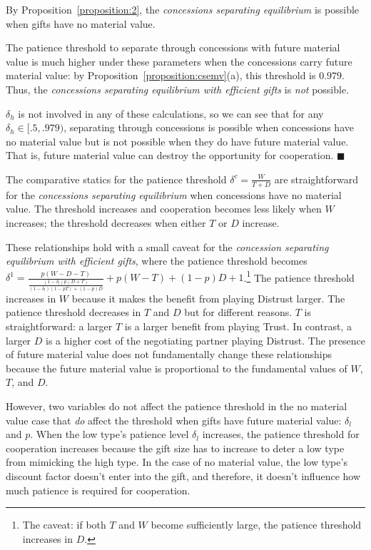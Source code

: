 \documentclass[bibtex,autowc]{apsr_submission}
\newcommand{\de}{\delta}
\begin{document}
By Proposition~\ref{proposition:2}, the \emph{concessions separating equilibrium} is possible when gifts have no material value.

The patience threshold to separate through concessions with future material value is much higher under these parameters when the concessions carry future material value: by Proposition~\ref{proposition:csemv}(a), this threshold is $0.979$. Thus, the \emph{concessions separating equilibrium with efficient gifts} is \emph{not} possible. 

$\de_h$ is not involved in any of these calculations, so we can see that for any $\de_h \in [.5,.979)$, separating through concessions is possible when concessions have no material value but is not possible when they do have future material value. That is, future material value can destroy the opportunity for cooperation. \hfill $\blacksquare$ 

The comparative statics for the patience threshold $\de^c = \frac{W}{T+D}$ are straightforward for the \emph{concessions separating equilibrium} when concessions have no material value. The threshold increases and cooperation becomes less likely when $W$ increases; the threshold decreases when either $T$ or $D$ increase. 

These relationships hold with a small caveat for the \emph{concession separating equilibrium with efficient gifts}, where the patience threshold becomes $\de^{1} = \frac{p(W-D-T)}{\frac{\left(1-\de_l\right)p\left(D + T\right)}{\left(1-\de_l\right)\left(1 - pT \right) + (1-p) D}} + p (W-T) + (1-p)D + 1$.\footnote{The caveat: if both $T$ and $W$ become sufficiently large, the patience threshold increases in $D$.} The patience threshold increases in $W$ because it makes the benefit from playing Distrust larger. The patience threshold decreases in $T$ and $D$ but for different reasons. $T$ is straightforward: a larger $T$ is a larger benefit from playing Trust. In contrast, a larger $D$ is a higher cost of the negotiating partner playing Distrust. The presence of future material value does not fundamentally change these relationships because the future material value is proportional to the fundamental values of $W$, $T$, and $D$.

However, two variables do not affect the patience threshold in the no material value case that \textit{do} affect the threshold when gifts have future material value: $\de_l$ and $p$. When the low type's patience level $\de_l$ increases, the patience threshold for cooperation increases because the gift size has to increase to deter a low type from mimicking the high type. In the case of no material value, the low type's discount factor doesn't enter into the gift, and therefore, it doesn't influence how much patience is required for cooperation.
\end{document}
